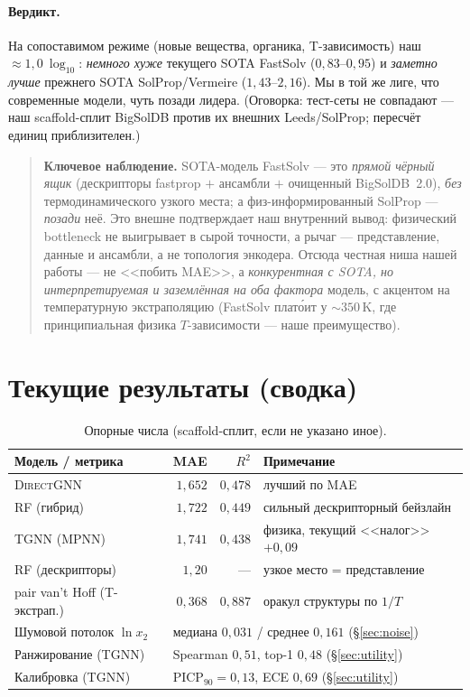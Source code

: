 \documentclass[11pt]{article}
\theoremstyle{plain}
\theoremstyle{definition}
\newcommand{\lnx}{\ln x_2}
\begin{document}
\paragraph{Вердикт.} На сопоставимом режиме (новые вещества, органика,
T-зависимость) наш $\approx1{,}0\ \log_{10}$: \emph{немного хуже} текущего SOTA
FastSolv ($0{,}83$--$0{,}95$) и \emph{заметно лучше} прежнего SOTA
SolProp/Vermeire ($1{,}43$--$2{,}16$). Мы в той же лиге, что современные модели,
чуть позади лидера. (Оговорка: тест-сеты не совпадают --- наш scaffold-сплит
BigSolDB против их внешних Leeds/SolProp; пересчёт единиц приблизителен.)

\begin{quote}\textbf{Ключевое наблюдение.} SOTA-модель FastSolv --- это
\emph{прямой чёрный ящик} (дескрипторы fastprop $+$ ансамбли $+$ очищенный
BigSolDB~2.0), \emph{без} термодинамического узкого места; а физ-информированный
SolProp --- \emph{позади} неё. Это внешне подтверждает наш внутренний вывод:
физический bottleneck не выигрывает в сырой точности, а рычаг --- представление,
данные и ансамбли, а не топология энкодера. Отсюда честная ниша нашей работы ---
не <<побить MAE>>, а \emph{конкурентная с SOTA, но интерпретируемая и заземлённая
на оба фактора} модель, с акцентом на температурную экстраполяцию (FastSolv
плато́ит у ${\sim}350$\,K, где принципиальная физика $T$-зависимости --- наше
преимущество).\end{quote}

\section{Текущие результаты (сводка)}
\begin{table}[h]
\centering
\caption{Опорные числа (scaffold-сплит, если не указано иное).}
\begin{tabular}{lrr l}
\toprule
Модель / метрика & MAE & $R^2$ & Примечание \\
\midrule
\textsc{DirectGNN} & $1{,}652$ & $0{,}478$ & лучший по MAE \\
RF (гибрид) & $1{,}722$ & $0{,}449$ & сильный дескрипторный бейзлайн \\
\textsc{TGNN} (MPNN) & $1{,}741$ & $0{,}438$ & физика, текущий <<налог>> $+0{,}09$ \\
RF (дескрипторы) & $1{,}20$ & --- & узкое место = представление \\
pair van't Hoff (T-экстрап.) & $0{,}368$ & $0{,}887$ & оракул структуры по $1/T$ \\
\midrule
Шумовой потолок $\lnx$ & \multicolumn{3}{l}{медиана $0{,}031$ / среднее $0{,}161$ (\S\ref{sec:noise})} \\
Ранжирование (TGNN) & \multicolumn{3}{l}{Spearman $0{,}51$, top-1 $0{,}48$ (\S\ref{sec:utility})} \\
Калибровка (TGNN) & \multicolumn{3}{l}{PICP$_{90}=0{,}13$, ECE $0{,}69$ (\S\ref{sec:utility})} \\
\bottomrule
\end{tabular}
\end{table}
\end{document}
